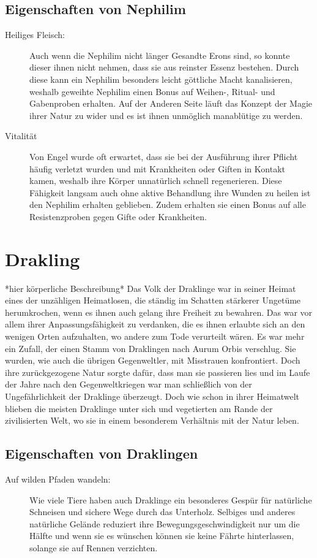 \documentclass[a4paper,12pt,oneside]{book}
\begin{document}
\subsection{Eigenschaften von Nephilim}
\begin{description}
\item[Heiliges Fleisch:]
Auch wenn die Nephilim nicht länger Gesandte Erons sind, so konnte dieser ihnen nicht nehmen, dass sie aus reinster Essenz bestehen. Durch diese kann ein Nephilim besonders leicht göttliche Macht kanalisieren, weshalb geweihte Nephilim einen Bonus auf Weihen-, Ritual- und Gabenproben erhalten. Auf der Anderen Seite läuft das Konzept der Magie ihrer Natur zu wider und es ist ihnen unmöglich manablütige zu werden.
\item[Vitalität]
Von Engel wurde oft erwartet, dass sie bei der Ausführung ihrer Pflicht häufig verletzt wurden und mit Krankheiten oder Giften in Kontakt kamen, weshalb ihre Körper unnatürlich schnell regenerieren. Diese Fähigkeit langsam auch ohne aktive Behandlung ihre Wunden zu heilen ist den Nephilim erhalten geblieben. Zudem erhalten sie einen Bonus auf alle Resistenzproben gegen Gifte oder Krankheiten.
\end{description}

\section{Drakling}\label{Drakling}
*hier körperliche Beschreibung*
Das Volk der Draklinge war in seiner Heimat eines der unzähligen Heimatlosen, die ständig im Schatten stärkerer Ungetüme herumkrochen, wenn es ihnen auch gelang ihre Freiheit zu bewahren. Das war vor allem ihrer Anpassungsfähigkeit zu verdanken, die es ihnen erlaubte sich an den wenigen Orten aufzuhalten, wo andere zum Tode verurteilt wären. Es war mehr ein Zufall, der einen Stamm von Draklingen nach Aurum Orbis verschlug. Sie wurden, wie auch die übrigen Gegenweltler, mit Misstrauen konfrontiert. Doch ihre zurückgezogene Natur sorgte dafür, dass man sie passieren lies und im Laufe der Jahre nach den Gegenweltkriegen war man schließlich von der Ungefährlichkeit der Draklinge überzeugt. Doch wie schon in ihrer Heimatwelt blieben die meisten Draklinge unter sich und vegetierten am Rande der zivilisierten Welt, wo sie in einem besonderem Verhältnis mit der Natur leben.
\subsection{Eigenschaften von Draklingen}
\begin{description}
\item[Auf wilden Pfaden wandeln:]
Wie viele Tiere haben auch Draklinge ein besonderes Gespür für natürliche Schneisen und sichere Wege durch das Unterholz. Selbiges und anderes natürliche Gelände reduziert ihre Bewegungsgeschwindigkeit nur um die Hälfte und wenn sie es wünschen können sie keine Fährte hinterlassen, solange sie auf Rennen verzichten.

\end{description}
\end{document}
